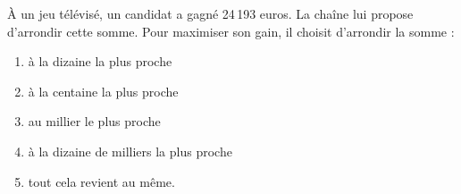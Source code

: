 \`A un jeu télévisé, un candidat a gagné 24\,193 euros. La chaîne lui propose d'arrondir cette
somme. Pour maximiser son gain, il choisit d'arrondir la somme :
\begin{multicols}{3}
  \begin{enumerate}[A/]
  \item à la dizaine la plus proche
  \item à la centaine la plus proche
  \item au millier le plus proche
  \item à la dizaine de milliers la plus proche
  \item tout cela revient au même.
  \end{enumerate}
\end{multicols}